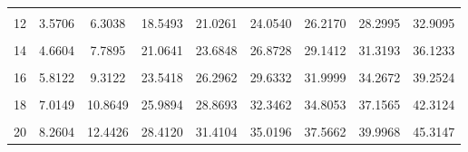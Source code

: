 \documentclass[
]{article}
\begin{document}
\begin{table}[H]
{\begin{tabular}[t]{ccccccccc}
\cellcolor{gray!10}{11} & \cellcolor{gray!10}{3.0535} & \cellcolor{gray!10}{5.5778} & \cellcolor{gray!10}{17.2750} & \cellcolor{gray!10}{19.6751} & \cellcolor{gray!10}{22.6179} & \cellcolor{gray!10}{24.7250} & \cellcolor{gray!10}{26.7568} & \cellcolor{gray!10}{31.2641}\\
12 & 3.5706 & 6.3038 & 18.5493 & 21.0261 & 24.0540 & 26.2170 & 28.2995 & 32.9095\\
\cellcolor{gray!10}{13} & \cellcolor{gray!10}{4.1069} & \cellcolor{gray!10}{7.0415} & \cellcolor{gray!10}{19.8119} & \cellcolor{gray!10}{22.3620} & \cellcolor{gray!10}{25.4715} & \cellcolor{gray!10}{27.6882} & \cellcolor{gray!10}{29.8195} & \cellcolor{gray!10}{34.5282}\\
14 & 4.6604 & 7.7895 & 21.0641 & 23.6848 & 26.8728 & 29.1412 & 31.3193 & 36.1233\\
\cellcolor{gray!10}{15} & \cellcolor{gray!10}{5.2293} & \cellcolor{gray!10}{8.5468} & \cellcolor{gray!10}{22.3071} & \cellcolor{gray!10}{24.9958} & \cellcolor{gray!10}{28.2595} & \cellcolor{gray!10}{30.5779} & \cellcolor{gray!10}{32.8013} & \cellcolor{gray!10}{37.6973}\\
16 & 5.8122 & 9.3122 & 23.5418 & 26.2962 & 29.6332 & 31.9999 & 34.2672 & 39.2524\\
\cellcolor{gray!10}{17} & \cellcolor{gray!10}{6.4078} & \cellcolor{gray!10}{10.0852} & \cellcolor{gray!10}{24.7690} & \cellcolor{gray!10}{27.5871} & \cellcolor{gray!10}{30.9950} & \cellcolor{gray!10}{33.4087} & \cellcolor{gray!10}{35.7185} & \cellcolor{gray!10}{40.7902}\\
18 & 7.0149 & 10.8649 & 25.9894 & 28.8693 & 32.3462 & 34.8053 & 37.1565 & 42.3124\\
\cellcolor{gray!10}{19} & \cellcolor{gray!10}{7.6327} & \cellcolor{gray!10}{11.6509} & \cellcolor{gray!10}{27.2036} & \cellcolor{gray!10}{30.1435} & \cellcolor{gray!10}{33.6874} & \cellcolor{gray!10}{36.1909} & \cellcolor{gray!10}{38.5823} & \cellcolor{gray!10}{43.8202}\\
20 & 8.2604 & 12.4426 & 28.4120 & 31.4104 & 35.0196 & 37.5662 & 39.9968 & 45.3147\\
\bottomrule
\end{tabular}}
\end{table}
\end{document}

